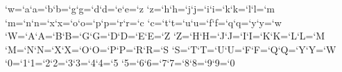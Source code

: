 \def\init{\message{@Name of the font to test = }
  \read-1 to\fontname
  \font\testfont=\fontname
  \headline={\sevenrm Test of \fontname\unskip\ on \today\ at \hours\hfil
    Page \folio}
  \testfont \setbaselineskip
  \ifdim\fontdimen6\testfont<10pt \rightskip=0pt plus 20pt
  \else\rightskip=0pt plus 2em \fi
  \spaceskip=\fontdimen2\testfont %
  \xspaceskip=\fontdimen2\testfont \advance\xspaceskip by\fontdimen7\testfont
  \message{Now type a test command (\string\help\space for help):}}
     
\def\mixture{\promptthree \domix\mixpattern}
\def\alternation{\promptthree \domix\altpattern}
\def\mixpattern{\0\1\0\0\1\1\0\0\0\1\1\1\0\1}
\def\altpattern{\0\1\0\1\0\1\0\1\0\1\0\1\0\1\0\1\0}
\def\domix#1{\par\chardef\0=\background \n=\starting
  \until\ifnum\n=\ending\do\chardef\1=\n #1\par\n=\count\n \repeat}
     
\count`w=`a\count`a=`b\count`b=`g\count`g=`d\count`d=`e\count`e=`z
\count`z=`h\count`h=`j\count`j=`i\count`i=`k\count`k=`l\count`l=`m
\count`m=`n\count`n=`x\count`x=`o\count`o=`p\count`p=`r\count`r=`c
\count`c=`t\count`t=`u\count`u=`f\count`f=`q\count`q=`y\count`y=`w
\count`W=`A\count`A=`B\count`B=`G\count`G=`D\count`D=`E\count`E=`Z
\count`Z=`H\count`H=`J\count`J=`I\count`I=`K\count`K=`L\count`L=`M
\count`M=`N\count`N=`X\count`X=`O\count`O=`P\count`P=`R\count`R=`S
\count`S=`T\count`T=`U\count`U=`F\count`F=`Q\count`Q=`Y\count`Y=`W
\count`0=`1\count`1=`2\count`2=`3\count`3=`4\count`4=`5
\count`5=`6\count`6=`7\count`7=`8\count`8=`9\count`9=`0
     
\long{}
\def\etareti{\cond\let\next=\relax\else\let\next=\etareti\fi\body\next}
     
\def\alphabet{\setchar\background \dosseries{`a}{`w}}
\def\ALPHABET{\setchar\background \doseries{`A}{`W}}
\def\series{\promptthree \doseries\starting\ending}
\def\doseries#1#2{\def\!{\discretionary{\background}{\background}{\background}}
  \!\n=#1\until\ifnum\n=#2\do\char\n\!\n=\count\n \repeat\par}
\def\dosseries#1#2{\def\!{\discretionary{\background}{\background}{\background}}
  \!\n=#1\until\ifnum\n=#2\do\char\n\!\n=\count\n \repeat s\par}
     
\def\lowers{\docomprehensive hs{`a}{`w}}
\def\uppers{\docomprehensive HO{`A}{`W}}
\def\digits{\docomprehensive H0{`0}{`9}}
\def\docomprehensive#1#2#3#4{\par\n=#3
  \until\ifnum\n=#4\do\line{\altr#1\hfil\altr#2}\n=\count\n\repeat}
\def\altr#1{\setbox0=\hbox{#1}\setbox2=\hbox{#1\char\n}%
  \dim=.5\hsize \advance\dim-\wd0 \divide\dim\wd2 \multiply\dim\wd2
  \xleaders\box2\hskip\dim\box0}
\def\alphabets{\m=`a\until\ifnum\m=`w
  \do\chardef\background=\m{\dosseries{`a}{`w}}\m=\count\m \repeat}
\def\ALPHABETS{\m=`A\until\ifnum\m=`W
  \do\chardef\background=\m{\doseries{`A}{`W}}\m=\count\m \repeat}
     

